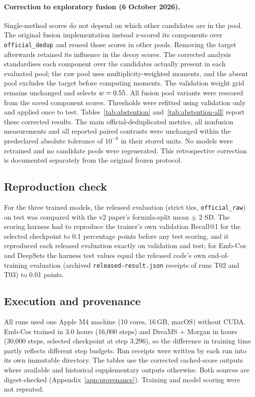 \documentclass[11pt]{article}
\newcommand{\m}[1]{\texttt{#1}}
\begin{document}
\paragraph{Correction to exploratory fusion (6 October 2026).} Single-method scores do not depend on
which other candidates are in the pool. The original fusion implementation instead z-scored its components over
\m{official\_dedup} and reused those scores in other pools. Removing the target afterwards retained its influence
in the decoy scores. The corrected analysis standardises each component over the candidates actually present in
each evaluated pool; the raw pool uses multiplicity-weighted moments, and the absent pool excludes the target
before computing moments. The validation weight grid remains unchanged and selects $w=0.55$.
All fusion pool variants were rescored from the saved component scores. Thresholds were refitted using validation
only and applied once to test. Tables~\ref{tab:abstention} and~\ref{tab:abstention-all} report these corrected results.
The main official-deduplicated metrics, all nonfusion measurements and all reported paired contrasts were unchanged
within the predeclared absolute tolerance of $10^{-8}$ in their stored units. No models were retrained and no candidate
pools were regenerated. This retrospective correction is documented separately from the original frozen protocol.

\subsection{Reproduction check}\label{sec:repro-methods}
For the three trained models, the released evaluation (strict ties, \m{official\_raw}) on test was compared with the v2
paper's formula-split mean $\pm$ 2 SD. The scoring harness had to reproduce the trainer's own validation Recall@1 for the
selected checkpoint to 0.1 percentage points before any test scoring, and it reproduced each released evaluation exactly
on validation and test; for Emb-Cos and DeepSets the harness test values equal the released code's own end-of-training
evaluation (archived \m{released-result.json} receipts of runs T02 and T03) to 0.01 points.

\subsection{Execution and provenance}\label{sec:provenance}
All runs used one Apple M4 machine (10 cores, 16\,GB, macOS) without CUDA. Emb-Cos trained in 3.0 hours (16,000 steps) and
DreaMS + Morgan in \TrainHours{} hours (30,000 steps, selected checkpoint at step 3,296), so the difference in training time
partly reflects different step budgets. Run receipts were written by each run into its own immutable directory. The
tables use the corrected cached-score outputs where available and historical supplementary outputs otherwise.
Both sources are digest-checked (Appendix~\ref{app:provenance}). Training and model scoring were not repeated.
\end{document}
